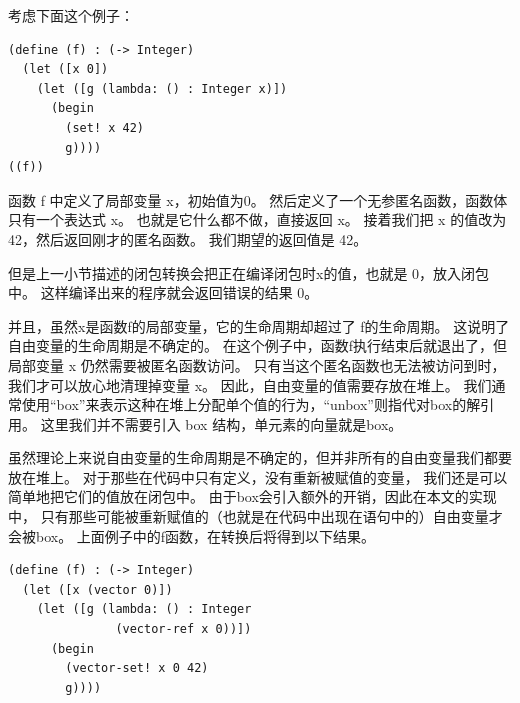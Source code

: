 考虑下面这个例子：

\begin{lstlisting}
(define (f) : (-> Integer)
  (let ([x 0])
    (let ([g (lambda: () : Integer x)])
      (begin
        (set! x 42)
        g))))
((f))
\end{lstlisting}

函数 f 中定义了局部变量 x，初始值为0。
然后定义了一个无参匿名函数，函数体只有一个表达式 x。
也就是它什么都不做，直接返回 x。
接着我们把 x 的值改为 42，然后返回刚才的匿名函数。
我们期望的返回值是 42。

但是上一小节描述的闭包转换会把正在编译闭包时x的值，也就是 0，放入闭包中。
这样编译出来的程序就会返回错误的结果 0。

并且，虽然x是函数f的局部变量，它的生命周期却超过了 f的生命周期。
这说明了自由变量的生命周期是不确定的。
在这个例子中，函数f执行结束后就退出了，但局部变量 x 仍然需要被匿名函数访问。
只有当这个匿名函数也无法被访问到时，我们才可以放心地清理掉变量 x。
因此，自由变量的值需要存放在堆上。
我们通常使用“box”来表示这种在堆上分配单个值的行为，“unbox”则指代对box的解引用。
这里我们并不需要引入 box 结构，单元素的向量就是box。

虽然理论上来说自由变量的生命周期是不确定的，但并非所有的自由变量我们都要放在堆上。
对于那些在代码中只有定义，没有重新被赋值的变量，
我们还是可以简单地把它们的值放在闭包中。
由于box会引入额外的开销，因此在本文的实现中，
只有那些可能被重新赋值的（也就是在代码中出现在语句中的）自由变量才会被box。
上面例子中的f函数，在转换后将得到以下结果。

\begin{lstlisting}
(define (f) : (-> Integer)
  (let ([x (vector 0)])
    (let ([g (lambda: () : Integer
               (vector-ref x 0))])
      (begin
        (vector-set! x 0 42)
        g))))
\end{lstlisting}
